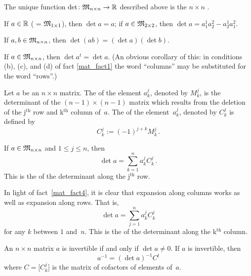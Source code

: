 \begin{defn} The unique function $\det \colon  \mathfrak{M}_{n \times n} \rightarrow \mathbb{R}$ described above is
the $n \times n$
.
\end{defn}

\begin{fact} If $a \in \mathbb{R}$ ( = $\mathfrak{M}_{1 \times 1}$), then $\det a = a$; if
$a \in \mathfrak{M}_{2 \times 2}$, then $\det a = a_1^1 a_2^2 - a_2^1 a_1^2$.
\end{fact}

\begin{fact} If $a, b \in \mathfrak{M}_{n \times n}$, then $\det(ab) = (\det a)(\det b)$.
\end{fact}

\begin{fact}\label{mat_fact4} If $a \in \mathfrak{M}_{n \times n}$, then $\det a^t = \det a$.
(An obvious corollary of this: in conditions (b), (c), and (d) of fact \ref{mat_fact1} the
word ``columns'' may be substituted for the word ``rows''.)
\end{fact}

\begin{defn} Let $a$ be an $n \times n$ matrix.  The
 of the element $a_k^j$, denoted by $M_k^j$, is the determinant of the $(n-1) \times
(n-1)$ matrix which results from the deletion of the j$^{\text{th}}$ row and k$^{\text{th}}$
column of~$a$.  The
 of the element~$a_k^j$, denoted by $C_k^j$ is defined
by
  \[ C_k^j := (-1)^{j+k}M_k^j\,. \]
\end{defn}

\begin{fact} If $a \in \mathfrak{M}_{n \times n}$ and $1 \le j \le n$, then
  \[ \det a = \sum_{k=1}^n a_k^j C_k^j\,. \]
This is the
 of the determinant along the j$^{\text{th}}$ row.
\end{fact}

In light of fact~\ref{mat_fact4}, it is clear that expansion along columns works as well as
expansion along rows.  That is,
  \[ \det a = \sum_{j=1}^n a_k^j C_k^j \]
for any $k$ between $1$ and~$n$.  This is the  of the determinant
along the k$^{\text{th}}$ column.

\begin{fact}\label{fact_matr_inv} An $n \times n$ matrix $a$ is invertible if and only if
$\det a \ne 0$.  If $a$ is invertible, then
 \[ a^{-1} =  (\det a)^{-1} C^t \]
where $C = \bigl[C_k^j\bigr]$ is the matrix of cofactors of elements of~$a$.
\end{fact}

